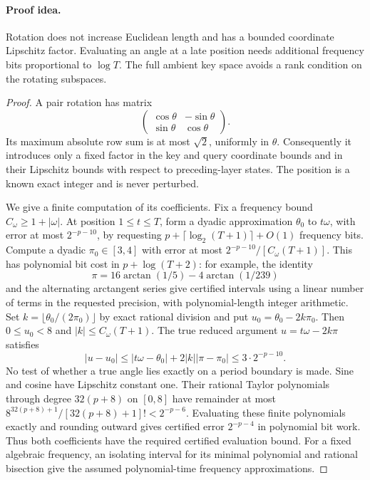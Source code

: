 \paragraph{Proof idea.}
Rotation does not increase Euclidean length and has a bounded
coordinate Lipschitz factor.  Evaluating an angle at a late
position needs additional frequency bits proportional to
$\log T$.  The full ambient key space avoids a rank condition
on the rotating subspaces.

\begin{proof}
A pair rotation has matrix
\[
 \begin{pmatrix}\cos\theta&-\sin\theta\\
                 \sin\theta& \cos\theta\end{pmatrix}.
\]
Its maximum absolute row sum is at most $\sqrt2$, uniformly in
$\theta$.  Consequently it introduces only a fixed factor in
the key and query coordinate bounds and in their Lipschitz
bounds with respect to preceding-layer states.  The position
is a known exact integer and is never perturbed.

We give a finite computation of its coefficients.  Fix a
frequency bound $C_\omega\ge1+|\omega|$.  At position
$1\le t\le T$, form a dyadic approximation $\theta_0$ to
$t\omega$, with error at most $2^{-p-10}$, by requesting
$p+\lceil\log_2(T+1)\rceil+O(1)$ frequency bits.
Compute a dyadic $\pi_0\in[3,4]$ with error at most
$2^{-p-10}/[C_\omega(T+1)]$.
This has polynomial bit cost in $p+\log(T+2)$: for example,
the identity
\[
 \pi=16\arctan(1/5)-4\arctan(1/239)
\]
and the alternating arctangent series give certified intervals
using a linear number of terms in the requested precision,
with polynomial-length integer arithmetic.
Set $k=\lfloor\theta_0/(2\pi_0)\rfloor$ by exact rational
division and put $u_0=\theta_0-2k\pi_0$.
Then $0\le u_0<8$ and $|k|\le C_\omega(T+1)$.
The true reduced argument $u=t\omega-2k\pi$ satisfies
\[
 |u-u_0|\le|t\omega-\theta_0|+2|k||\pi-\pi_0|
          \le3\cdot2^{-p-10}.
\]
No test of whether a true angle lies exactly on a period
boundary is made.  Sine and cosine have Lipschitz constant one.
Their rational Taylor polynomials through degree $32(p+8)$
on $[0,8]$ have remainder at most
$8^{32(p+8)+1}/[32(p+8)+1]!<2^{-p-6}$.
Evaluating these finite polynomials exactly and rounding outward
gives certified error $2^{-p-4}$ in polynomial bit work.
Thus both coefficients have the
required certified evaluation bound.  For a fixed algebraic
frequency, an isolating interval for its minimal polynomial
and rational bisection give the assumed polynomial-time
frequency approximations.


\end{proof}
